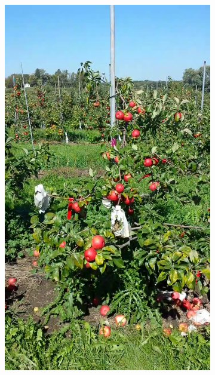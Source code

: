 \begin{figure}[!htb]
\begin{subfigure}[b]{0.18\textwidth}
    \includegraphics[width=\textwidth]{figures/detection/training4.png}%
    \end{subfigure}\hspace{.2cm} \begin{subfigure}[b]{0.18\textwidth}

\end{subfigure}
\end{figure}
